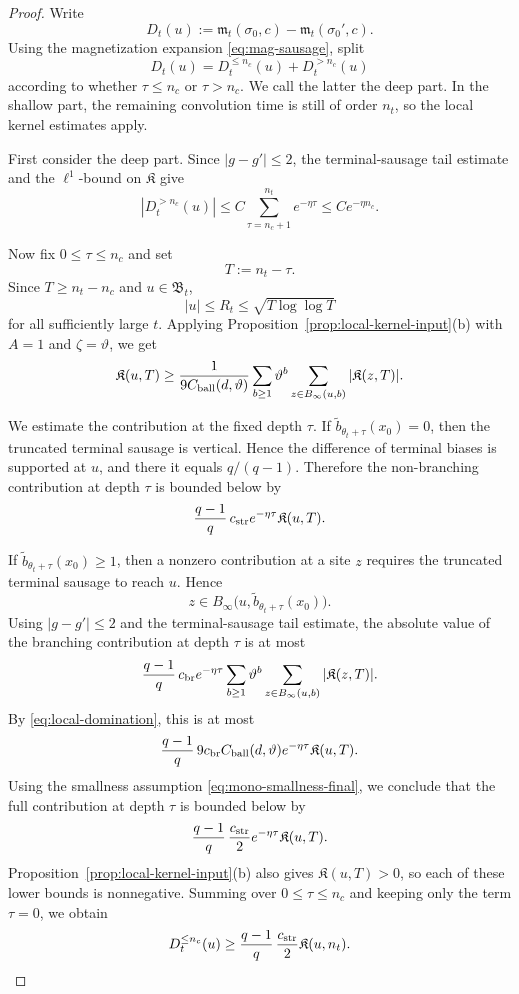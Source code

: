 \documentclass[letterpaper,11pt,reqno]{amsart}
\theoremstyle{definition}
\newcommand{\IK}{\mathfrak{K}}
\begin{document}
\begin{proof}
Write
\[
D_t(u):=\mathfrak m_t(\sigma_0,c)-\mathfrak m_t(\sigma_0',c).
\]
Using the magnetization expansion \eqref{eq:mag-sausage}, split
\[
D_t(u)=D_t^{\le n_c}(u)+D_t^{>n_c}(u)
\]
according to whether \(\tau\le n_c\) or \(\tau>n_c\).
We call the latter the deep part. In the shallow part, the remaining convolution time is still of order \(n_t\), so the local
kernel estimates apply.

First consider the deep part. Since \(|g-g'|\le2\), the terminal-sausage tail estimate and the
\(\ell^1\)-bound on \(\IK\) give
\begin{equation}\label{eq:deep-bound}
|D_t^{>n_c}(u)|
\le
C\sum_{\tau=n_c+1}^{n_t}e^{-\eta\tau}
\le
C e^{-\eta n_c}.
\end{equation}

Now fix \(0\le\tau\le n_c\) and set
\[
T:=n_t-\tau.
\]
Since \(T\ge n_t-n_c\) and \(u\in\mathfrak B_t\),
\[
|u|\le R_t\le \sqrt{T\log\log T}
\]
for all sufficiently large \(t\). Applying Proposition~\ref{prop:local-kernel-input}(b) with
\(A=1\) and \(\zeta=\vartheta\), we get
\begin{equation}\label{eq:local-domination}
\IK(u,T)
\ge
\frac{1}{9C_{\rm ball}(d,\vartheta)}
\sum_{b\ge1}\vartheta^b
\sum_{z\in B_\infty(u,b)}|\IK(z,T)|.
\end{equation}

We estimate the contribution at the fixed depth \(\tau\). If
\(\tilde b_{\theta_t+\tau}(x_0)=0\), then the truncated terminal sausage is vertical. Hence the
difference of terminal biases is supported at \(u\), and there it equals \(q/(q-1)\). Therefore the
non-branching contribution at depth \(\tau\) is bounded below by
\[
\frac{q-1}{q}\,
c_{\rm str}e^{-\eta\tau}\IK(u,T).
\]

If \(\tilde b_{\theta_t+\tau}(x_0)\ge1\), then a nonzero contribution at a site \(z\) requires the
truncated terminal sausage to reach \(u\). Hence
\[
z\in B_\infty\bigl(u,\tilde b_{\theta_t+\tau}(x_0)\bigr).
\]
Using \(|g-g'|\le2\) and the terminal-sausage tail estimate, the absolute value of the branching
contribution at depth \(\tau\) is at most
\[
\frac{q-1}{q}\,
c_{\rm br}e^{-\eta\tau}
\sum_{b\ge1}\vartheta^b
\sum_{z\in B_\infty(u,b)}|\IK(z,T)|.
\]
By \eqref{eq:local-domination}, this is at most
\[
\frac{q-1}{q}\,
9c_{\rm br}C_{\rm ball}(d,\vartheta)e^{-\eta\tau}\IK(u,T).
\]
Using the smallness assumption \eqref{eq:mono-smallness-final}, we conclude that the full
contribution at depth \(\tau\) is bounded below by
\[
\frac{q-1}{q}\,
\frac{c_{\rm str}}2 e^{-\eta\tau}\IK(u,T).
\]
Proposition~\ref{prop:local-kernel-input}(b) also gives \(\IK(u,T)>0\), so each of these lower
bounds is nonnegative. Summing over \(0\le\tau\le n_c\) and keeping only the term \(\tau=0\), we
obtain
\begin{equation}\label{eq:shallow-lower-clean}
D_t^{\le n_c}(u)
\ge
\frac{q-1}{q}\,
\frac{c_{\rm str}}2\IK(u,n_t).
\end{equation}


\end{proof}
\end{document}
